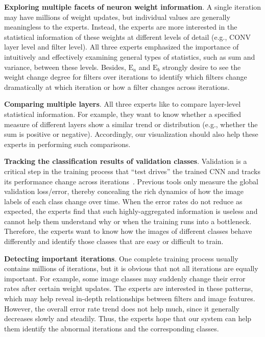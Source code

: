 \documentclass[format=acmsmall, review=false, screen=true]{acmart}
\newcommand{\ea}{{$\mathrm{E}_a$}\xspace}
\newcommand{\eb}{{$\mathrm{E}_b$}\xspace}
\begin{document}
	\item \textbf{Exploring multiple facets of neuron weight information}.
	A single iteration may have millions of weight updates, but individual values are generally meaningless to the experts.
	Instead, the experts are more interested in the statistical information of these weights at different levels of detail (e.g., CONV layer level and filter level).
	All three experts emphasized the importance of intuitively and effectively examining general types of statistics, such as sum and variance, between these levels.
	Besides, \ea and \eb strongly desire to see the weight change degree for filters over iterations to identify which filters change dramatically at which iteration or how a filter changes across iterations.


	\item \textbf{Comparing multiple layers}.
	All three experts like to compare layer-level statistical information.
	For example, they want to know whether a specified measure of different layers show a similar trend or distribution (e.g., whether the sum is positive or negative).
	Accordingly, our visualization should also help these experts in performing such comparisons.

	\item \textbf{Tracking the classification results of validation classes}.
	Validation is a critical step in the training process that ``test drives'' the trained CNN and tracks its performance change across iterations~\cite{bengio2012practical}.
	Previous tools only measure the global validation loss/error, thereby concealing the rich dynamics of how the image labels of each class change over time.
	When the error rates do not reduce as expected, the experts find that such highly-aggregated information is useless and cannot help them understand why or when the training runs into a bottleneck.
	Therefore, the experts want to know how the images of different classes behave differently and identify those classes that are easy or difficult to train.

	\item \textbf{Detecting important iterations}.
	One complete training process usually contains millions of iterations, but it is obvious that not all iterations are equally important.
	For example, some image classes may suddenly change their error rates after certain weight updates.
	The experts are interested in these patterns, which may help reveal in-depth relationships between filters and image features.
	However, the overall error rate trend does not help much, since it generally decreases slowly and steadily.
	Thus, the experts hope that our system can help them identify the abnormal iterations and the corresponding classes.
\end{document}
